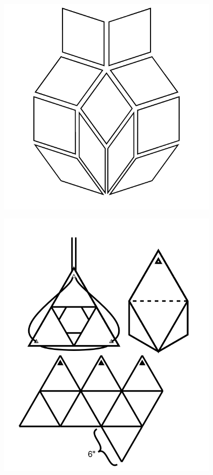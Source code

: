 \documentclass[17pt]{extreport}
\begin{document}
	\begin{figure}
		\centering
		\includegraphics[width=6.25in]{imageserver/uploadimages/pi.png}
	\end{figure}
	\begin{figure}
		\centering
		\includegraphics[width=7.25in]{imageserver/uploadimages/artbox.png}
	\end{figure}
	
\end{document}
